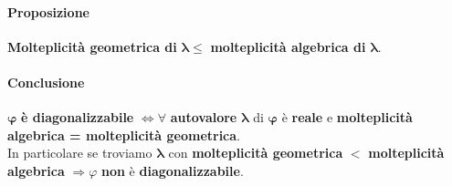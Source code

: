 \documentclass[a4paper, 12pt]{report}
\begin{document}
                    \paragraph{Proposizione} \textbf{Molteplicità geometrica di} $\boldsymbol{\lambda \leq}$ \textbf{molteplicità algebrica di} $\boldsymbol{\lambda}$.
                    \paragraph{Conclusione} $\boldsymbol{\varphi}$ \textbf{è diagonalizzabile} $\boldsymbol{\Leftrightarrow \forall}$ \textbf{autovalore} $\boldsymbol{\lambda}$ di $\boldsymbol{\varphi}$ è \textbf{reale} e \textbf{molteplicità algebrica = molteplicità geometrica}.\\[10px]
                    In particolare se troviamo $\boldsymbol{\lambda}$ con \textbf{molteplicità geometrica} $\boldsymbol{<}$ \textbf{molteplicità algebrica} $\Rightarrow \varphi$ \textbf{non} è \textbf{diagonalizzabile}.
\end{document}
